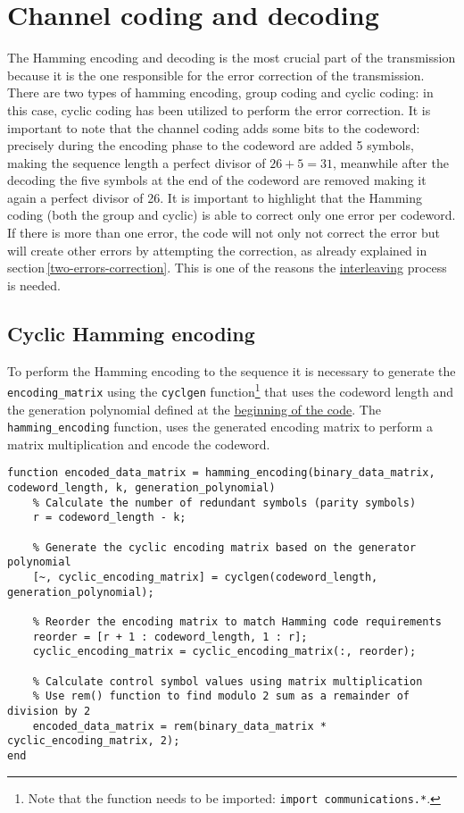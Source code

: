 \vspace{40px} \section{Channel coding and decoding}
The Hamming encoding and decoding is the most crucial part of the transmission because it is the one responsible for the error correction of the transmission. There are two types of hamming encoding, group coding and cyclic coding: in this case, cyclic coding has been utilized to perform the error correction. It is important to note that the channel coding adds some bits to the codeword: precisely during the encoding phase to the codeword are added 5 symbols, making the sequence length a perfect divisor of $26 + 5 = 31$, meanwhile after the decoding the five symbols at the end of the codeword are removed making it again a perfect divisor of 26. It is important to highlight that the Hamming coding (both the group and cyclic) is able to correct only one error per codeword. If there is more than one error, the code will not only not correct the error but will create other errors by attempting the correction, as already explained in section\,\ref{two-errors-correction}. This is one of the reasons the \hyperref[interleaving-process]{interleaving} process is needed.





\subsection{Cyclic Hamming encoding}\label{hamming-encoding}
To perform the Hamming encoding to the sequence it is necessary to generate the \texttt{encoding\_matrix} using the \texttt{cyclgen} function\footnote{Note that the function needs to be imported: \texttt{import communications.*}.} that uses the codeword length and the generation polynomial defined at the \hyperref[initial-parameters]{beginning of the code}. The \texttt{hamming\_encoding} function, uses the generated encoding matrix to perform a matrix multiplication and encode the codeword.

\begin{lstlisting}
function encoded_data_matrix = hamming_encoding(binary_data_matrix, codeword_length, k, generation_polynomial)
    % Calculate the number of redundant symbols (parity symbols)
    r = codeword_length - k;
    
    % Generate the cyclic encoding matrix based on the generator polynomial
    [~, cyclic_encoding_matrix] = cyclgen(codeword_length, generation_polynomial);
    
    % Reorder the encoding matrix to match Hamming code requirements
    reorder = [r + 1 : codeword_length, 1 : r];
    cyclic_encoding_matrix = cyclic_encoding_matrix(:, reorder);
    
    % Calculate control symbol values using matrix multiplication
    % Use rem() function to find modulo 2 sum as a remainder of division by 2
    encoded_data_matrix = rem(binary_data_matrix * cyclic_encoding_matrix, 2);
end
\end{lstlisting}


